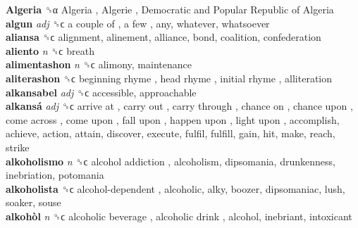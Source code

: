 \textbf{Algeria} ␝α   Algeria ,  Algerie ,  Democratic and Popular Republic of Algeria   \\
\textbf{algun} \emph{adj}  ␝ϲ   a couple of ,  a few , any, whatever, whatsoever  \\
\textbf{aliansa} ␝ϲ  alignment, alinement, alliance, bond, coalition, confederation  \\
\textbf{aliento} \emph{n}  ␝ϲ  breath  \\
\textbf{alimentashon} \emph{n}  ␝ϲ  alimony, maintenance  \\
\textbf{aliterashon} ␝ϲ   beginning rhyme ,  head rhyme ,  initial rhyme , alliteration  \\
\textbf{alkansabel} \emph{adj}  ␝ϲ  accessible, approachable  \\
\textbf{alkansá} \emph{adj}  ␝ϲ   arrive at ,  carry out ,  carry through ,  chance on ,  chance upon ,  come across ,  come upon ,  fall upon ,  happen upon ,  light upon , accomplish, achieve, action, attain, discover, execute, fulfil, fulfill, gain, hit, make, reach, strike  \\
\textbf{alkoholismo} \emph{n}  ␝ϲ   alcohol addiction , alcoholism, dipsomania, drunkenness, inebriation, potomania  \\
\textbf{alkoholista} ␝ϲ   alcohol-dependent , alcoholic, alky, boozer, dipsomaniac, lush, soaker, souse  \\
\textbf{alkohòl} \emph{n}  ␝ϲ   alcoholic beverage ,  alcoholic drink , alcohol, inebriant, intoxicant  \\
